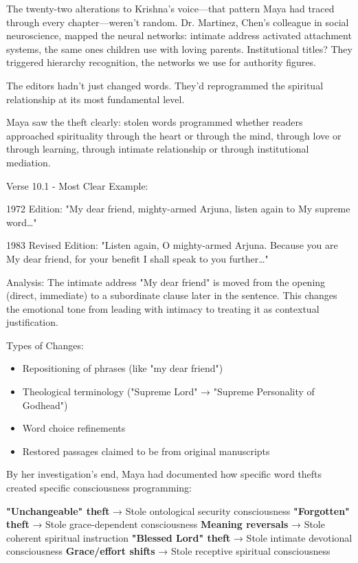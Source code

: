 \documentclass[12pt,twoside]{book}
\begin{document}
The twenty-two alterations to Krishna's voice—that pattern Maya had traced through every chapter—weren't random. Dr. Martinez, Chen's colleague in social neuroscience, mapped the neural networks: intimate address activated attachment systems, the same ones children use with loving parents. Institutional titles? They triggered hierarchy recognition, the networks we use for authority figures. 

The editors hadn't just changed words. They'd reprogrammed the spiritual relationship at its most fundamental level.

Maya saw the theft clearly: stolen words programmed whether readers approached spirituality through the heart or through the mind, through love or through learning, through intimate relationship or through institutional mediation.

Verse 10.1 - Most Clear Example:

1972 Edition:
"My dear friend, mighty-armed Arjuna, listen again to My supreme word\ldots{}"

1983 Revised Edition:
"Listen again, O mighty-armed Arjuna. Because you are My dear friend, for your benefit I shall speak to you further\ldots{}"

Analysis: The intimate address "My dear friend" is moved from the opening (direct, immediate) to a subordinate clause later in the sentence. This changes the emotional tone from leading with intimacy to treating it as contextual justification.

Types of Changes:

\begin{itemize}
\item Repositioning of phrases (like "my dear friend")
\item Theological terminology ("Supreme Lord" → "Supreme Personality of
Godhead")
\item Word choice refinements
\item Restored passages claimed to be from original manuscripts
\end{itemize}


By her investigation's end, Maya had documented how specific word thefts created specific consciousness programming:

\textbf{\textbf{"Unchangeable" theft}} → Stole ontological security consciousness
\textbf{\textbf{"Forgotten" theft}} → Stole grace-dependent consciousness  
\textbf{\textbf{Meaning reversals}} → Stole coherent spiritual instruction
\textbf{\textbf{"Blessed Lord" theft}} → Stole intimate devotional consciousness
\textbf{\textbf{Grace/effort shifts}} → Stole receptive spiritual consciousness
\end{document}
